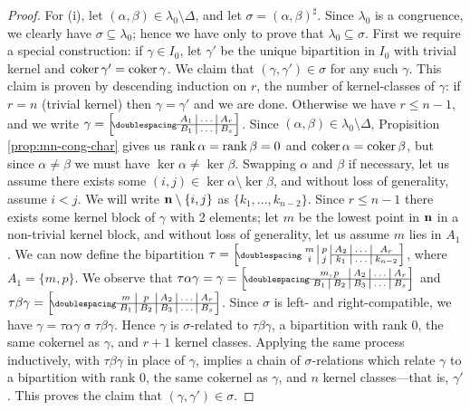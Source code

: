 \begin{lemma}
\begin{proof}
    For (i), let $(\alpha, \beta) \in \lambda_0 \setminus \Delta$, and let
    $\sigma = (\alpha, \beta)^\sharp$.  Since $\lambda_0$ is a congruence, we
    clearly have $\sigma \subseteq \lambda_0$; hence we have only to prove that
    $\lambda_0 \subseteq \sigma$.  First we require a special construction: if
    $\gamma \in I_0$, let $\gamma'$ be the unique bipartition in $I_0$ with
    trivial kernel and $\operatorname{coker}\gamma' = \operatorname{coker}\gamma$.  We claim that
    $(\gamma, \gamma') \in \sigma$ for any such $\gamma$.  This claim is proven
    by descending induction on $r$, the number of kernel-classes of $\gamma$: if
    $r = n$ (trivial kernel) then $\gamma = \gamma'$ and we are done.  Otherwise
    we have $r \leq n-1$, and we write
    $\gamma = \bipart{c|c|c}{1-3}{A_1&\ldots&A_r}{B_1&\ldots&B_s}$.  Since
    $(\alpha,\beta) \in \lambda_0 \setminus \Delta$, Propisition
    \ref{prop:mn-cong-char} gives us $\operatorname{rank}\alpha = \operatorname{rank}\beta = 0$ and
    $\operatorname{coker}\alpha = \operatorname{coker}\beta$, but since $\alpha \neq \beta$ we must have
    $\ker\alpha \neq \ker\beta$.  Swapping $\alpha$ and $\beta$ if necessary,
    let us assume there exists some $(i,j) \in \ker\alpha \setminus \ker\beta$,
    and without loss of generality, assume $i < j$.  We will write
    $\mathbf{n} \setminus \{i,j\}$ as $\{k_1, \ldots, k_{n-2}\}$.  Since $r \leq n-1$
    there exists some kernel block of $\gamma$ with 2 elements; let $m$
    be the lowest point in $\mathbf{n}$ in a non-trivial kernel block, and without loss
    of generality, let us assume $m$ lies in $A_1$.  We can now define the
    bipartition $\tau = \bipart{c|c|c|c|c}{3-5}
    {m & p & A_2 & \ldots & A_r}
    {i & j & k_1 & \ldots & k_{n-2}}$, 
    where $A_1 = \{m, p\}$.
    We observe that $\tau \alpha \gamma = \gamma = \bipart{c|c|c|c|c}{1-5}
    {\mc2{c|}{m,p} & A_2 & \ldots & A_r}
    {B_1 & B_2 & B_3 & \ldots & B_s}$ and
    $\tau \beta \gamma = \bipart{c|c|c|c|c}{1-5}
    {m & p & A_2 & \ldots & A_r}
    {B_1 & B_2 & B_3 & \ldots & B_s}$.
    Since $\sigma$ is left- and right-compatible, we have
    $\gamma = \tau\alpha\gamma \mathrel\sigma \tau\beta\gamma$.  Hence $\gamma$
    is $\sigma$-related to $\tau\beta\gamma$, a bipartition with rank $0$, the
    same cokernel as $\gamma$, and $r+1$ kernel classes.  Applying the same
    process inductively, with $\tau\beta\gamma$ in place of $\gamma$, implies a
    chain of $\sigma$-relations which relate $\gamma$ to a bipartition with rank
    $0$, the same cokernel as $\gamma$, and $n$ kernel classes---that is,
    $\gamma'$.  This proves the claim that $(\gamma, \gamma') \in \sigma$.


\end{proof}
\end{lemma}
